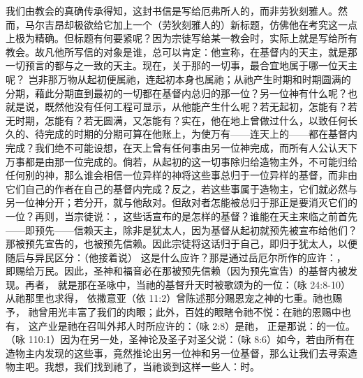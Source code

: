 我们由教会的真确传承得知，这封书信是写给厄弗所人的，而非劳狄刻雅人。然而，马尔吉昂却极欲给它加上一个（劳狄刻雅人的）新标题，仿佛他在考究这一点上极为精确。但标题有何要紧呢？因为宗徒写给某一教会时，实际上就是写给所有教会。故凡他所写信的对象是谁，总可以肯定：他宣称，在基督内的天主，就是那一切预言的都与之一致的天主。现在，关于那的一切事，最合宜地属于哪一位天主呢？ 岂非那万物从起初便属祂，连起初本身也属祂；从祂产生时期和时期圆满的分期，藉此分期直到最初的一切都在基督内总归的那一位？另一位神有什么呢？也就是说，既然他没有任何工程可显示，从他能产生什么呢？若无起初，怎能有？若无时期，怎能有？若无圆满，又怎能有？实在，他在地上曾做过什么，以致任何长久的、待完成的时期的分期可算在他账上，为使万有——连天上的——都在基督内完成？我们绝不可能设想，在天上曾有任何事由另一位神完成，而所有人公认天下万事都是由那一位完成的。倘若，从起初的这一切事除归给造物主外，不可能归给任何别的神，那么谁会相信一位异样的神将这些事总归于一位异样的基督，而非由它们自己的作者在自己的基督内完成？反之，若这些事属于造物主，它们就必然与另一位神分开；若分开，就与他敌对。但敌对者怎能被总归于那正是要消灭它们的一位？再则，当宗徒说：，这些话宣布的是怎样的基督？谁能在天主来临之前首先——即预先——信赖天主，除非是犹太人，因为基督从起初就预先被宣布给他们？那被预先宣告的，也被预先信赖。因此宗徒将这话归于自己，即归于犹太人，以便随后与异民区分：（他接着说） 这是什么应许？那是通过岳厄尔所作的应许：， 即赐给万民。因此，圣神和福音必在那被预先信赖（因为预先宣告）的基督内被发现。再者， 就是那在圣咏中，当祂的基督升天时被歌颂为的一位：（咏 24:8-10）从祂那里也求得， 依撒意亚（依 11:2）曾陈述那分赐恩宠之神的七重。祂也赐予， 祂曾用光丰富了我们的肉眼；此外，百姓的眼瞎令祂不悦：在祂的恩赐中也有， 这产业是祂在召叫外邦人时所应许的：（咏 2:8）是祂， 正是那说：的一位。（咏 110:1）因为在另一处，圣神论及圣子对圣父说：（咏 8:6）如今，若由所有在造物主内发现的这些事，竟然推论出另一位神和另一位基督，那么让我们去寻索造物主吧。我想，我们找到祂了，当祂谈到这样一些人：时。 
